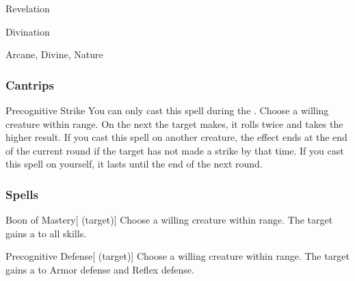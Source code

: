 \newpage
\begin{spellsection}{Revelation}

\begin{spellheader}
\end{spellheader}


 Divination

 Arcane, Divine, Nature

\subsubsection{Cantrips}


\begin{freeability}{Precognitive Strike}
You can only cast this spell during the .
Choose a willing creature within \rngclose range.
On the next  the target makes, it rolls twice and takes the higher result.
If you cast this spell on another creature, the effect ends at the end of the current round if the target has not made a strike by that time.
If you cast this spell on yourself, it lasts until the end of the next round.
\end{freeability}

\end{spellsection}


\subsubsection{Spells}


\lowercase{\hypertarget{spell:Boon of Mastery}{}}\label{spell:Boon of Mastery}
\begin{attuneability}[\nth{1}]{\hypertarget{spell:Boon of Mastery}{Boon of Mastery}}[ (target)]
Choose a willing creature within \rngclose range.
The target gains a   to all skills.
\end{attuneability}
\vspace{0.25em}



\lowercase{\hypertarget{spell:Precognitive Defense}{}}\label{spell:Precognitive Defense}
\begin{attuneability}[\nth{1}]{\hypertarget{spell:Precognitive Defense}{Precognitive Defense}}[ (target)]
Choose a willing creature within \rngclose range.
The target gains a   to Armor defense and Reflex defense.
\end{attuneability}
\vspace{0.25em}



